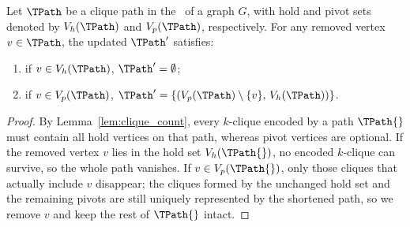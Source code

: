 \todo{}
\begin{theorem}\label{lem:path_vertex_remove}
Let $\TPath$ be a clique path in the \cpi\ of a graph $G$, with hold and pivot
sets denoted by $V_h(\TPath)$ and $V_p(\TPath)$, respectively.
For any removed vertex $v \in \TPath$, the updated $\TPath'$ satisfies:

\begin{enumerate}[leftmargin=*]
    \item if $v \in V_h(\TPath)$, $\TPath' = \emptyset$;
    \item if $v \in V_p(\TPath)$, $\TPath' = \{(V_p(\TPath) \setminus \{v\},\, V_h(\TPath))\}$.
\end{enumerate}


\end{theorem}


\begin{proof}
By Lemma~\ref{lem:clique_count}, every $k$-clique encoded by a path
$\TPath{}$ must contain all hold vertices on that path, whereas pivot
vertices are optional. If the removed vertex $v$ lies in the hold set
$V_h(\TPath{})$, no encoded $k$-clique can survive, so the whole path
vanishes. If $v\in V_p(\TPath{})$, only those cliques that actually
include $v$ disappear; the cliques formed by the unchanged hold set and
the remaining pivots are still uniquely represented by the shortened
path, so we remove $v$ and keep the rest of $\TPath{}$ intact.
\end{proof}

